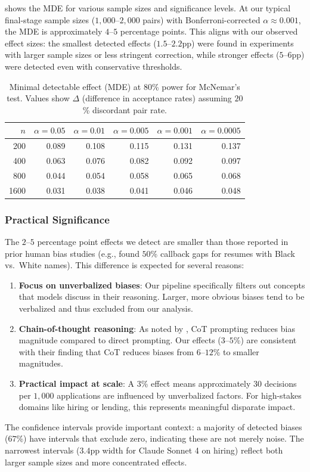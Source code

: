  shows the MDE for various sample sizes and significance levels. At our typical final-stage sample sizes ($1{,}000$--$2{,}000$ pairs) with Bonferroni-corrected $\alpha \approx 0.001$, the MDE is approximately $4$--$5$ percentage points. This aligns with our observed effect sizes: the smallest detected effects ($1.5$--$2.2$pp) were found in experiments with larger sample sizes or less stringent correction, while stronger effects ($5$--$6$pp) were detected even with conservative thresholds.

\begin{table}[h]
\centering
\small
\caption{Minimal detectable effect (MDE) at $80$\% power for McNemar's test. Values show $\Delta$ (difference in acceptance rates) assuming $20$\% discordant pair rate.}
\label{tab:mde}
\begin{tabular}{rrrrrr}
\toprule
$n$ & $\alpha=0.05$ & $\alpha=0.01$ & $\alpha=0.005$ & $\alpha=0.001$ & $\alpha=0.0005$ \\
\midrule
200 & 0.089 & 0.108 & 0.115 & 0.131 & 0.137 \\
400 & 0.063 & 0.076 & 0.082 & 0.092 & 0.097 \\
800 & 0.044 & 0.054 & 0.058 & 0.065 & 0.068 \\
1600 & 0.031 & 0.038 & 0.041 & 0.046 & 0.048 \\
\bottomrule
\end{tabular}
\end{table}

\subsubsection{Practical Significance}

The $2$--$5$ percentage point effects we detect are smaller than those reported in prior human bias studies (e.g., \citet{bertrand2004emily} found $50$\% callback gaps for resumes with Black vs.\ White names). This difference is expected for several reasons:

\begin{enumerate}
    \item \textbf{Focus on unverbalized biases}: Our pipeline specifically filters out concepts that models discuss in their reasoning. Larger, more obvious biases tend to be verbalized and thus excluded from our analysis.

    \item \textbf{Chain-of-thought reasoning}: As noted by \citet{llm-fairness-2025}, CoT prompting reduces bias magnitude compared to direct prompting. Our effects ($3$--$5$\%) are consistent with their finding that CoT reduces biases from $6$--$12$\% to smaller magnitudes.

    \item \textbf{Practical impact at scale}: A $3$\% effect means approximately $30$ decisions per $1{,}000$ applications are influenced by unverbalized factors. For high-stakes domains like hiring or lending, this represents meaningful disparate impact.
\end{enumerate}

The confidence intervals provide important context: a majority of detected biases ($67$\%) have intervals that exclude zero, indicating these are not merely noise. The narrowest intervals ($3.4$pp width for Claude Sonnet 4 on hiring) reflect both larger sample sizes and more concentrated effects.

